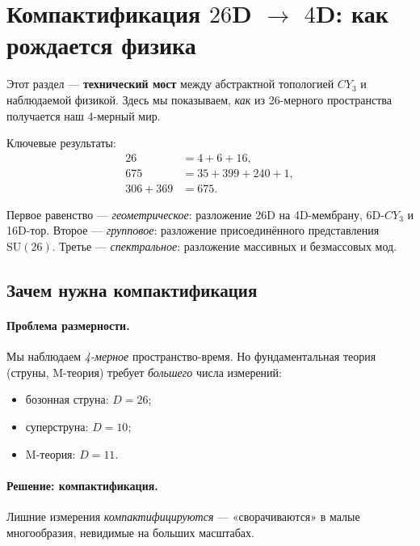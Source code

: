 \documentclass[11pt,a4paper]{article}
\newcommand{\SU}{\mathrm{SU}}
\newcommand{\CY}{CY_3}
\theoremstyle{definition}
\begin{document}
\section{Компактификация $26$D $\to$ $4$D: как рождается физика}
\label{sec:compactification}

Этот раздел — \textbf{технический мост} между абстрактной 
топологией $\CY$ и наблюдаемой физикой. Здесь мы показываем, 
\emph{как} из 26-мерного пространства получается наш 
4-мерный мир.

Ключевые результаты:
\begin{align}
    26 &= 4 + 6 + 16, \label{eq:dim-decomp} \\
    675 &= 35 + 399 + 240 + 1, \label{eq:adjoint-decomp} \\
    306 + 369 &= 675. \label{eq:mass-decomp}
\end{align}

Первое равенство — \emph{геометрическое}: разложение 26D на 
4D-мембрану, 6D-$\CY$ и 16D-тор. Второе — \emph{групповое}: 
разложение присоединённого представления $\SU(26)$. 
Третье — \emph{спектральное}: разложение массивных и 
безмассовых мод.

\subsection{Зачем нужна компактификация}
\label{subsec:why-compactification}

\paragraph{Проблема размерности.}
Мы наблюдаем \emph{4-мерное} пространство-время. Но 
фундаментальная теория (струны, M-теория) требует 
\emph{большего} числа измерений:
\begin{itemize}
    \item бозонная струна: $D = 26$;
    \item суперструна: $D = 10$;
    \item M-теория: $D = 11$.
\end{itemize}

\paragraph{Решение: компактификация.}
Лишние измерения \emph{компактифицируются} — «сворачиваются» 
в малые многообразия, невидимые на больших масштабах.
\end{document}
